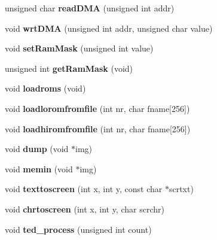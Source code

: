 \begin{DoxyCompactItemize}
unsigned char {\bfseries read\+D\+MA} (unsigned int addr)
\item 
\mbox{\label{class_t_e_d_af2fc691da5e806c89156a497ea3120b8}} 
void {\bfseries wrt\+D\+MA} (unsigned int addr, unsigned char value)
\item 
\mbox{\label{class_t_e_d_a58636c461d6855965eb142a434fa59ff}} 
void {\bfseries set\+Ram\+Mask} (unsigned int value)
\item 
\mbox{\label{class_t_e_d_adb29efb36ce9f3f7e01ce300bc1e28f3}} 
unsigned int {\bfseries get\+Ram\+Mask} (void)
\item 
\mbox{\label{class_t_e_d_a359f247473a89c759b759be2389d3213}} 
void {\bfseries loadroms} (void)
\item 
\mbox{\label{class_t_e_d_a0d16e7acfbc7d84553d01c59f0c96279}} 
void {\bfseries loadloromfromfile} (int nr, char fname\mbox{[}256\mbox{]})
\item 
\mbox{\label{class_t_e_d_aa4c964fcec4adc60f1faaa555b4fbb3b}} 
void {\bfseries loadhiromfromfile} (int nr, char fname\mbox{[}256\mbox{]})
\item 
\mbox{\label{class_t_e_d_a5630d22f4ef9688ddcf642cb66785448}} 
void {\bfseries dump} (void $\ast$img)
\item 
\mbox{\label{class_t_e_d_a11beb04499c077816dd4eb1e61dcd63a}} 
void {\bfseries memin} (void $\ast$img)
\item 
\mbox{\label{class_t_e_d_ab494462b45b5ae2cc1084dfea0bf87b0}} 
void {\bfseries texttoscreen} (int x, int y, const char $\ast$scrtxt)
\item 
\mbox{\label{class_t_e_d_a397d0ae398bb1d6bbb426a37bd309ede}} 
void {\bfseries chrtoscreen} (int x, int y, char scrchr)
\item 
\mbox{\label{class_t_e_d_af4e6ff3aa8186aa67291268f401f8a47}} 
void {\bfseries ted\+\_\+process} (unsigned int count)
\item 
\mbox{\label{class_t_e_d_a29b0a06179c8d87e26f066f29138c294}} 

\end{DoxyCompactItemize}
